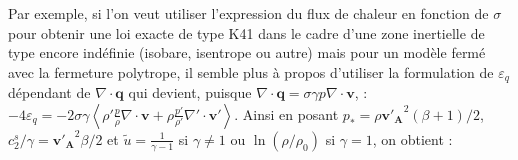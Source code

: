 Par exemple, si l'on veut utiliser l'expression du flux de chaleur en fonction de $\sigma$ pour obtenir une loi exacte de type \acs{K41} dans le cadre d'une zone inertielle de type encore indéfinie (isobare, isentrope ou autre) mais pour un modèle fermé avec la fermeture polytrope, il semble plus à propos d'utiliser la formulation de $\varepsilon_q$ dépendant de $\nabla \cdot \boldsymbol{q}$ qui devient, puisque $\nabla \cdot \boldsymbol{q} = \sigma \gamma p \nabla \cdot \boldsymbol{v}$, :
$- 4\varepsilon_q = - 2 \sigma \gamma\left< \rho'\frac{p}{\rho}\nabla \cdot \boldsymbol{v} + \rho\frac{p'}{\rho'}\nabla' \cdot \boldsymbol{v'} \right>$.
Ainsi en posant $p_* = \rho\boldsymbol{v'_A}^2\left(\beta +1\right)/2$, $c^s_2/\gamma = \boldsymbol{v'_A}^2\beta/2$ et $\tilde{u} = \frac{1}{\gamma-1}$ si $\gamma \neq 1$ ou $\ln\left(\rho/\rho_0\right)$ si $\gamma =1$, on obtient : 
